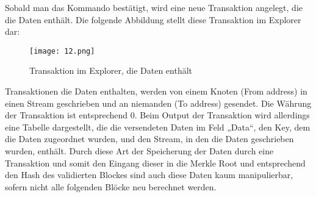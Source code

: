 Sobald man das Kommando bestätigt, wird eine neue Transaktion angelegt, die die Daten enthält. Die folgende Abbildung stellt diese Transaktion im Explorer dar:

\begin{figure}[h]
	\texttt{[image: 12.png]}
	\caption{Transaktion im Explorer, die Daten enthält}
	\label{fig:12}
\end{figure}

Transaktionen die Daten enthalten, werden von einem Knoten (From address) in einen Stream geschrieben und an niemanden (To address) gesendet. Die Währung der Transaktion ist entsprechend 0. Beim Output der Transaktion wird allerdings eine Tabelle dargestellt, die die versendeten Daten im Feld „Data“, den Key, dem die Daten zugeordnet wurden, und den Stream, in den die Daten geschrieben wurden, enthält. Durch diese Art der Speicherung der Daten durch eine Transaktion und somit den Eingang dieser in die Merkle Root und entsprechend den Hash des validierten Blockes sind auch diese Daten kaum manipulierbar, sofern nicht alle folgenden Blöcke neu berechnet werden.
